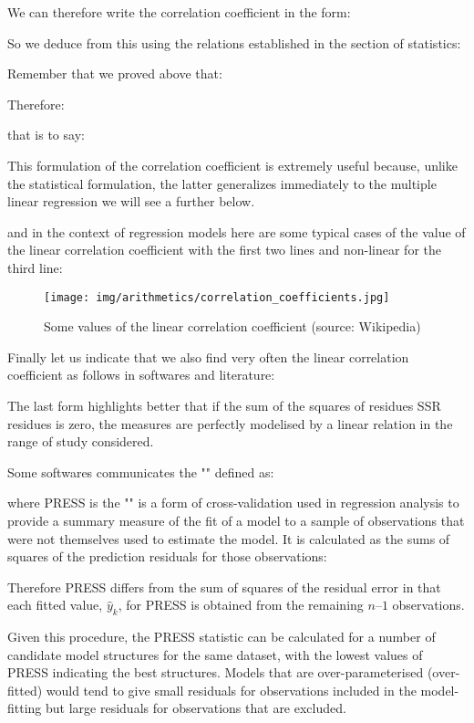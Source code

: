 	We can therefore write the correlation coefficient in the form:
	
	So we deduce from this using the relations established in the section of statistics:
	
	Remember that we proved above that:
	
	Therefore:
	
	that is to say:
	
	\begin{tcolorbox}[title=Remark,colframe=black,arc=10pt]
This formulation of the correlation coefficient is extremely useful because, unlike the statistical formulation, the latter generalizes immediately to the multiple linear regression we will see a further below.
	\end{tcolorbox}
	and in the context of regression models here are some typical cases of the value of the linear correlation coefficient with the first two lines and non-linear for the third line:
\begin{figure}[H]
\centering
\texttt{[image: img/arithmetics/correlation\_coefficients.jpg]}
\caption{Some values of the linear correlation coefficient (source: Wikipedia)}
\end{figure}
	Finally let us indicate that we also find very often the linear correlation coefficient as follows in softwares and literature:
	
	The last form highlights better that if the sum of the squares of residues SSR  residues is zero, the measures are perfectly modelised by a linear relation in the range of study considered.
	
	\begin{tcolorbox}[title=Remark,colframe=black,arc=10pt]
	Some softwares communicates the "" defined as:
	
	 where PRESS is the "" is a form of cross-validation used in regression analysis to provide a summary measure of the fit of a model to a sample of observations that were not themselves used to estimate the model. It is calculated as the sums of squares of the prediction residuals for those observations:
	 
	Therefore PRESS differs from the sum of squares of the residual error in that each fitted value, $\hat{y}_k$, for PRESS is obtained from the remaining $n – 1$ observations.
	
	Given this procedure, the PRESS statistic can be calculated for a number of candidate model structures for the same dataset, with the lowest values of PRESS indicating the best structures. Models that are over-parameterised (over-fitted) would tend to give small residuals for observations included in the model-fitting but large residuals for observations that are excluded.
	\end{tcolorbox}
	
